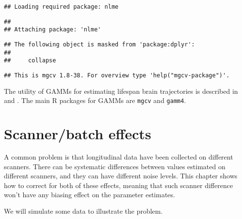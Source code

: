\documentclass[
]{book}
\begin{document}
\begin{verbatim}
## Loading required package: nlme
\end{verbatim}

\begin{verbatim}
## 
## Attaching package: 'nlme'
\end{verbatim}

\begin{verbatim}
## The following object is masked from 'package:dplyr':
## 
##     collapse
\end{verbatim}

\begin{verbatim}
## This is mgcv 1.8-38. For overview type 'help("mgcv-package")'.
\end{verbatim}

The utility of GAMMs for estimating lifespan brain trajectories is described in \citet{fjell2010} and \citet{sorensen2021}. The main R packages for GAMMs are \texttt{mgcv} and \texttt{gamm4}.

\hypertarget{scannerbatch-effects}{%
\section{Scanner/batch effects}\label{scannerbatch-effects}}

A common problem is that longitudinal data have been collected on different scanners. There can be systematic differences between values estimated on different scanners, and they can have different noise levels. This chapter shows how to correct for both of these effects, meaning that such scanner difference won't have any biasing effect on the parameter estimates.

We will simulate some data to illustrate the problem.
\end{document}
